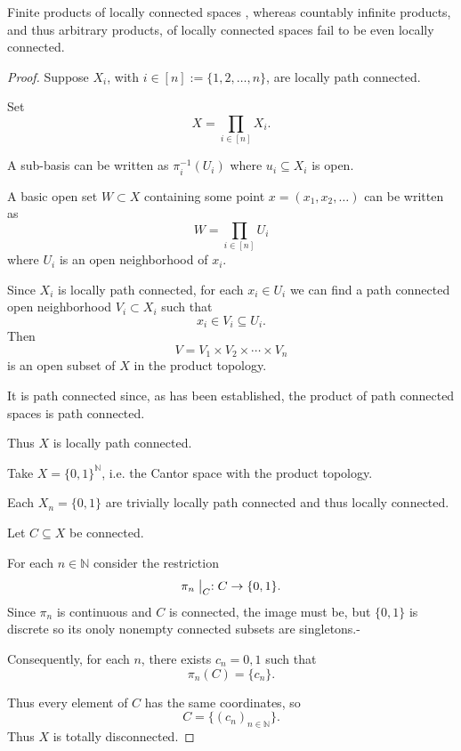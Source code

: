 \documentclass[11pt]{article}
\begin{document}
\begin{prop}\label{prop:product_local_connected}
    Finite products of locally connected spaces 
    , 
    whereas countably infinite products, and thus 
    arbitrary products, of locally connected spaces 
    fail to be even locally connected.  
\end{prop}
\begin{proof}
    Suppose $X_i$, with $i \in [n] := \{1,2,\ldots,n\}$, are 
    locally path connected. 

    Set 
    \[
        X = \prod_{i\in[n]} X_i.
    \]

    A sub-basis can be written as 
    $\pi_i^{-1}(U_i)$ where $u_i \subseteq X_i$ is open. 
    
    A basic open set $W \subset X$ containing 
    some point $x = (x_1,x_2,\ldots)$ can be written 
    as 
    \[
        W = \prod_{i\in[n]} U_i
    \]
    where $U_i$ is an open neighborhood of $x_i$. 

    Since $X_i$ is locally path connected, 
    for each $x_i \in U_i$ we can find 
    a path connected open neighborhood $V_i \subset X_i$ 
    such that 
    \[
        x_i \in V_i \subseteq U_i. 
    \]
    Then 
    \[
        V = V_1\times V_2 \times \cdots \times V_n 
    \]
    is an open subset of $X$ in the product topology. 

    It is path connected since, as has been established, 
    the product of path connected spaces is path connected. 

    Thus $X$ is locally path connected.


    Take $X = \{0,1\}^{\mathbb N}$, i.e. the Cantor space 
    with the product topology. 

    Each $X_n = \{0,1\}$ are trivially locally path connected 
    and thus locally connected. 

    Let $C \subseteq X$ be connected. 

    For each $n \in \mathbb N$ consider the 
    restriction 
    \[
        \pi_n\bigm|_C : C \to \{0,1\}. 
    \]
    Since $\pi_n$ is continuous and 
    $C$ is connected, the image must be, but 
    $\{0,1\}$ is discrete so its onoly nonempty 
    connected subsets are singletons.- 

    Consequently, for each $n$, there exists 
    $c_n = 0,1$ such that 
    \[
        \pi_n(C) = \{c_n\}. 
    \]

    Thus every element of $C$ has the 
    same coordinates, so 
    \[
        C = \{(c_n)_{n\in \mathbb N}\}. 
    \]
    Thus $X$ is totally disconnected. 

\end{proof}
\end{document}

